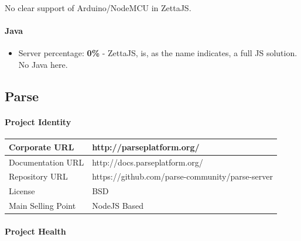 \documentclass{article}
\begin{document}
No clear support of Arduino/NodeMCU in ZettaJS.

\paragraph{Java}

\begin{itemize}
\item Server percentage: \textbf{0\%} - ZettaJS, is, as the name indicates, a full JS solution. No Java here.
\end{itemize}

\subsection{Parse}

\paragraph{Project Identity}

\begin{center}
\begin{tabular}{|l|l|}
\hline
Corporate URL & http://parseplatform.org/ \\ \hline
Documentation URL & http://docs.parseplatform.org/ \\ \hline
Repository URL & https://github.com/parse-community/parse-server \\ \hline
License & BSD \\ \hline
Main Selling Point & NodeJS Based \\ \hline
\end{tabular}
\end{center}

\paragraph{Project Health}
\end{document}
